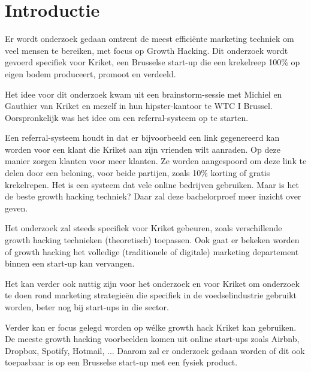 
\section{Introductie} %
\label{sec:introductie}

Er wordt onderzoek gedaan omtrent de meest efficiënte marketing techniek om veel mensen te bereiken, met focus op Growth Hacking. Dit onderzoek wordt gevoerd specifiek voor Kriket, een Brusselse start-up die een krekelreep 100\% op eigen bodem produceert, promoot en verdeeld.

Het idee voor dit onderzoek kwam uit een brainstorm-sessie met Michiel en Gauthier van Kriket en mezelf in hun hipster-kantoor te WTC I Brussel. Oorspronkelijk was het idee om een referral-systeem op te starten. 

Een referral-systeem houdt in dat er bijvoorbeeld een link gegenereerd kan worden voor een klant die Kriket aan zijn vrienden wilt aanraden. Op deze manier zorgen klanten voor meer klanten. Ze worden aangespoord om deze link te delen door een beloning, voor beide partijen, zoals 10\% korting of gratis krekelrepen. Het is een systeem dat vele online bedrijven gebruiken. Maar is het de beste growth hacking techniek? Daar zal deze bachelorproef meer inzicht over geven.

Het onderzoek zal steeds specifiek voor Kriket gebeuren, zoals verschillende growth hacking technieken (theoretisch) toepassen. Ook gaat er bekeken worden of growth hacking het volledige (traditionele of digitale) marketing departement binnen een start-up kan vervangen.

Het kan verder ook nuttig zijn voor het onderzoek en voor Kriket om onderzoek te doen rond marketing strategieën die specifiek in de voedselindustrie gebruikt worden, beter nog bij start-ups in die sector.

Verder kan er focus gelegd worden op wélke growth hack Kriket kan gebruiken. De meeste growth hacking voorbeelden komen uit online start-ups zoals Airbnb, Dropbox, Spotify, Hotmail, ... Daarom zal er onderzoek gedaan worden of dit ook toepasbaar is op een Brusselse start-up met een fysiek product.


